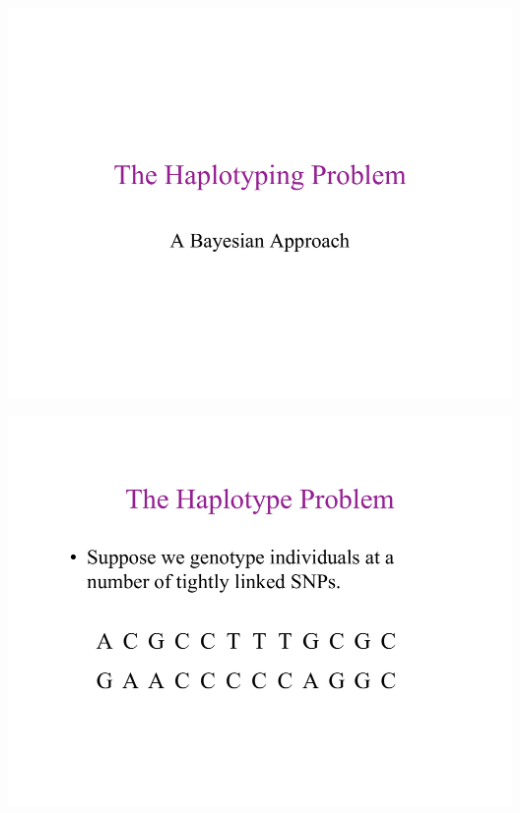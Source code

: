 










\newlength{\VertUp}
\setlength{\VertUp}{-1.5in}


\newslide{}
\mbox{}
\vspace*{\VertUp}
\enlargethispage*{1000pt}
\begin{center}
\includegraphics*[width=\textwidth]{PPT_pages/pg_0001.pdf}
\end{center}


\newslide{}
\mbox{}
\vspace*{\VertUp}
\enlargethispage*{1000pt}
\begin{center}
\includegraphics*[width=\textwidth]{PPT_pages/pg_0002.pdf}
\end{center}


